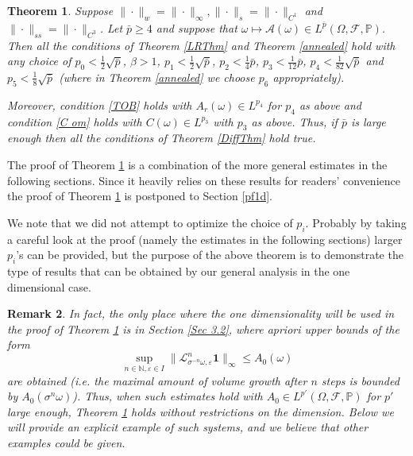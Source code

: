 \documentclass[11pt,reqno,a4paper]{article}
\newtheorem{theorem}{Theorem}
\theoremstyle{special}
\newtheorem{remark}[theorem]{Remark}
\def\N{\mathbb{N}}
\def\om{\omega}
\begin{document}
\begin{theorem}\label{1D EG}
Suppose $\|\cdot\|_w=\|\cdot\|_{\infty}, \|\cdot\|_s=\|\cdot\|_{C^1}$ and $\|\cdot\|_{ss}=\|\cdot\|_{C^3}$. 
Let $\bar p\geq 4$ and suppose that $\om\mapsto\mathcal A(\om)\in L^{\bar p}(\Omega,\mathcal F,\mathbb P)$. Then all the conditions of Theorem \ref{LRThm} and Theorem \ref{annealed}  hold with any choice of  $p_0<\frac12\sqrt{\bar p}$,  $\beta>1$, $p_1<\frac12\sqrt{\bar p}$, $p_2<\frac14\bar p$,  $p_3<\frac{1}{12}\bar p$, $p_4<\frac1{82}\sqrt{\bar p}$ and $p_5<\frac1{8}\sqrt{\bar p}$ (where in Theorem \ref{annealed} we choose $p_6$ appropriately).

Moreover, condition 
 \eqref{TOB} holds with $A_r(\om)\in L^{p_4}$ for $p_4$ as above 
 and 
condition \eqref{C om} holds with $C(\om)\in L^{p_3}$ with $p_3$ as above. Thus, if $\bar p$ is large enough then all the conditions of Theorem \ref{DiffThm} hold true.
\end{theorem}
The proof of Theorem \ref{1D EG} is a combination of the more general estimates in the following sections. Since it heavily relies on these results for readers' convenience  the proof of Theorem \ref{1D EG} is postponed to Section \ref{pf1d}.

We note that we did not attempt to optimize the choice of $p_i$. Probably by taking a careful look at the proof (namely the estimates in the following sections) larger $p_i$'s can be provided, but the purpose of the above theorem is to demonstrate the type of results that can be obtained by our general analysis in the one dimensional case.



 \begin{remark}\label{Rem Expand}
In fact, the only place where the one dimensionality will be used in the proof of Theorem \ref{1D EG} is in Section \ref{Sec 3.2}, where apriori upper bounds of the form  $$
\sup_{n\in\N,\varepsilon\in I}\|\mathcal L_{\sigma^{-n}\om,\varepsilon}^n\textbf{1}\|_\infty\leq A_0(\om)
$$
are obtained (i.e. the maximal amount of  volume growth after $n$ steps is bounded by $A_0(\sigma^n\om)$). Thus, when such estimates hold with $A_0\in L^{p'}(\Omega,\mathcal F,\mathbb P)$ for $p'$ large enough, Theorem \ref{1D EG} holds without restrictions on the dimension. Below we will provide an explicit example of such systems, and we believe that  other examples could be given.
 \end{remark}
\end{document}

